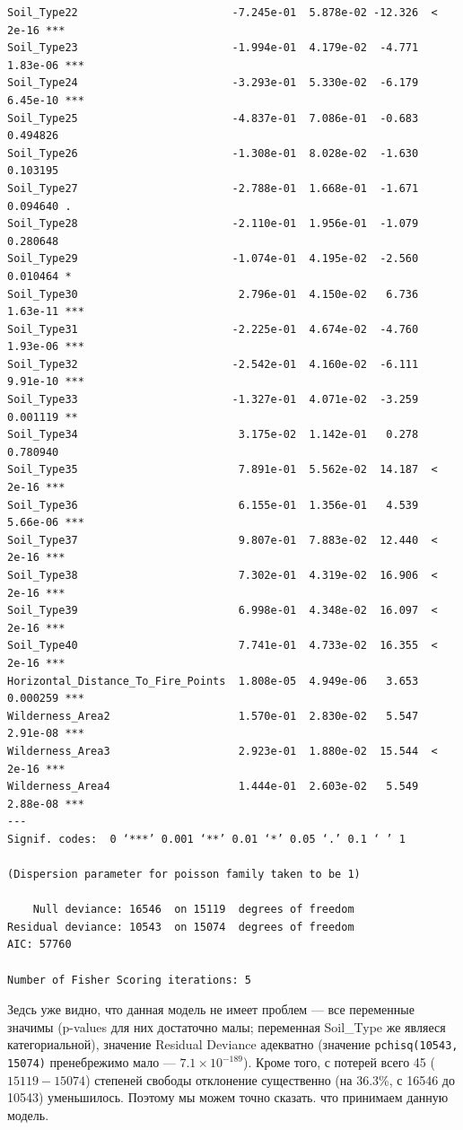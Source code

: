 \documentclass[12pt]{article}
\begin{document}
\begin{verbatim}
Soil_Type22                        -7.245e-01  5.878e-02 -12.326  < 2e-16 ***
Soil_Type23                        -1.994e-01  4.179e-02  -4.771 1.83e-06 ***
Soil_Type24                        -3.293e-01  5.330e-02  -6.179 6.45e-10 ***
Soil_Type25                        -4.837e-01  7.086e-01  -0.683 0.494826
Soil_Type26                        -1.308e-01  8.028e-02  -1.630 0.103195
Soil_Type27                        -2.788e-01  1.668e-01  -1.671 0.094640 .
Soil_Type28                        -2.110e-01  1.956e-01  -1.079 0.280648
Soil_Type29                        -1.074e-01  4.195e-02  -2.560 0.010464 *
Soil_Type30                         2.796e-01  4.150e-02   6.736 1.63e-11 ***
Soil_Type31                        -2.225e-01  4.674e-02  -4.760 1.93e-06 ***
Soil_Type32                        -2.542e-01  4.160e-02  -6.111 9.91e-10 ***
Soil_Type33                        -1.327e-01  4.071e-02  -3.259 0.001119 **
Soil_Type34                         3.175e-02  1.142e-01   0.278 0.780940
Soil_Type35                         7.891e-01  5.562e-02  14.187  < 2e-16 ***
Soil_Type36                         6.155e-01  1.356e-01   4.539 5.66e-06 ***
Soil_Type37                         9.807e-01  7.883e-02  12.440  < 2e-16 ***
Soil_Type38                         7.302e-01  4.319e-02  16.906  < 2e-16 ***
Soil_Type39                         6.998e-01  4.348e-02  16.097  < 2e-16 ***
Soil_Type40                         7.741e-01  4.733e-02  16.355  < 2e-16 ***
Horizontal_Distance_To_Fire_Points  1.808e-05  4.949e-06   3.653 0.000259 ***
Wilderness_Area2                    1.570e-01  2.830e-02   5.547 2.91e-08 ***
Wilderness_Area3                    2.923e-01  1.880e-02  15.544  < 2e-16 ***
Wilderness_Area4                    1.444e-01  2.603e-02   5.549 2.88e-08 ***
---
Signif. codes:  0 ‘***’ 0.001 ‘**’ 0.01 ‘*’ 0.05 ‘.’ 0.1 ‘ ’ 1

(Dispersion parameter for poisson family taken to be 1)

    Null deviance: 16546  on 15119  degrees of freedom
Residual deviance: 10543  on 15074  degrees of freedom
AIC: 57760

Number of Fisher Scoring iterations: 5
\end{verbatim}
Зедсь уже видно, что данная модель не имеет проблем --- все переменные значимы (p-values для них достаточно малы;
переменная Soil\_Type же являеся категориальной), значение
Residual Deviance адекватно (значение \verb|pchisq(10543, 15074)| пренебрежимо мало --- $7.1 \times 10^{-189}$).
Кроме того, с потерей всего 45 ($15119-15074$) степеней свободы отклонение существенно (на 36.3\%, с 16546 до 10543) уменьшилось.
Поэтому мы можем точно сказать. что принимаем данную модель.
\end{document}
